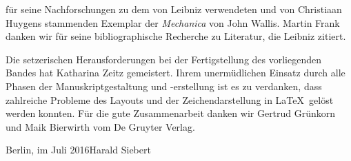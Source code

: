 für seine Nachforschungen zu dem von Leibniz verwendeten und von Christiaan Huygens stammenden Exemplar der \textit{Mechanica} von John Wallis. Martin Frank danken wir für seine bibliographische Recherche zu Literatur, die Leibniz zitiert.\par
Die setzerischen Herausforderungen bei der Fertigstellung des vorliegenden Bandes hat Katharina Zeitz gemeistert. Ihrem unermüdlichen Einsatz durch alle Phasen der Manuskriptgestaltung und -erstellung ist es zu verdanken, dass zahlreiche Probleme des Layouts und der Zeichendarstellung in \LaTeX\ gelöst werden konnten. Für die gute Zusammenarbeit danken wir Gertrud Grünkorn und Maik Bierwirth vom De Gruyter Verlag.
\par
\vspace*{2em}
Berlin, im Juli 2016\hspace{65mm}Harald Siebert


